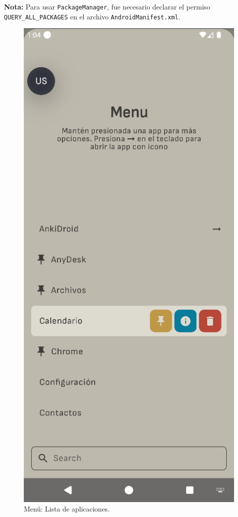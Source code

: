 \textbf{Nota:} Para usar \texttt{PackageManager}, fue necesario declarar el permiso \texttt{QUERY\_ALL\_PACKAGES} en el archivo \texttt{AndroidManifest.xml}. 

\begin{figure}[ht!]
  \centering
  \captionsetup{justification=centering}
  \begin{minipage}{0.43\textwidth}
    \caption{Menú: Lista de aplicaciones.}
    \label{fig:menu_lista_aplicaciones}
    \centering
    \includegraphics[width=\textwidth]{Figuras/secciones/menu_lista_aplicaciones.png}

\end{minipage}
\end{figure}
